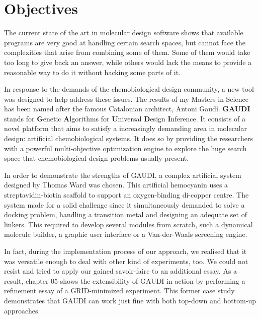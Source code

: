 \chapter{Objectives}

The current state of the art in molecular design software shows that available programs are very good at handling certain search spaces, but cannot face the complexities that arise from combining some of them. Some of them would take too long to give back an answer, while others would lack the means to provide a reasonable way to do it without hacking some parts of it.

In response to the demands of the chemobiological design community, a new tool was designed to help address these issues. The results of my Masters in Science has been named after the famous Catalonian architect, Antoni Gaudí. \textbf{GAUDI} stands for \textbf{G}enetic \textbf{A}lgorithms for \textbf{U}niversal \textbf{D}esign \textbf{I}nference. It consists of a novel platform that aims to satisfy a increasingly demanding area in molecular design: artificial chemobiological systems. It does so by providing the researchers with a powerful multi-objective optimization engine to explore the huge search space that chemobiological design problems usually present.

In order to demonstrate the strengths of GAUDI, a complex artificial system designed by Thomas Ward was chosen. This artificial hemocyanin uses a streptavidin-biotin scaffold to support an oxygen-binding di-copper centre. The system made for a solid challenge since it simultaneously demanded to solve a docking problem, handling a transition metal and designing an adequate set of linkers. This required to develop several modules from scratch, such a dynamical molecule builder, a graphic user interface or a Van-der-Waals screening engine.

In fact, during the implementation process of our approach, we realised that it was versatile enough to deal with other kind of experiments, too. We could not resist and tried to apply our gained savoir-faire to an additional essay. As a result, chapter 05 shows the extensibility of GAUDI in action by performing a refinement essay of a GRID-minimized experiment. This former case study demonstrates that GAUDI can work just fine with both top-down and bottom-up approaches.

